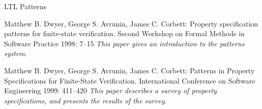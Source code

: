 \begin{Frame}[t]{LTL Patterns}

  \xxx\xxx

  \scriptsize
  \begin{thebibliography}{12}
    \bibitem{}
    Matthew B. Dwyer, George S. Avrunin, James C. Corbett:
    \newblock
    Property specification patterns for finite-state verification.
    \newblock
    Second Workshop on Formal Methods in Software Practice 1998: 7--15
    \newblock
    \emph{This paper gives an introduction to the patterns system.}

    \bibitem{}
    Matthew B. Dwyer, George S. Avrunin, James C. Corbett:
    \newblock
    Patterns in Property Specifications for Finite-State Verification.
    \newblock
    International Conference on Software Engineering 1999: 411--420
    \newblock
    \emph{This paper describes a survey of property specifications, and presents the results of the survey.}
  \end{thebibliography}
\end{Frame}

